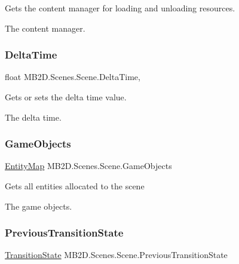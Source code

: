 Gets the content manager for loading and unloading resources. 

The content manager.\hypertarget{class_m_b2_d_1_1_scenes_1_1_scene_a43b51703cf436d8033fac12386b300ba}{}\label{class_m_b2_d_1_1_scenes_1_1_scene_a43b51703cf436d8033fac12386b300ba} 
\subsubsection{\texorpdfstring{Delta\+Time}{DeltaTime}}
{\footnotesize\ttfamily float M\+B2\+D.\+Scenes.\+Scene.\+Delta\+Time\hspace{0.3cm}{\ttfamily [get]}, {\ttfamily [set]}}



Gets or sets the delta time value. 

The delta time.\hypertarget{class_m_b2_d_1_1_scenes_1_1_scene_aae9f1aa11591fa124e5da41f53138ea1}{}\label{class_m_b2_d_1_1_scenes_1_1_scene_aae9f1aa11591fa124e5da41f53138ea1} 
\subsubsection{\texorpdfstring{Game\+Objects}{GameObjects}}
{\footnotesize\ttfamily \hyperlink{class_m_b2_d_1_1_entity_component_1_1_entity_map}{Entity\+Map} M\+B2\+D.\+Scenes.\+Scene.\+Game\+Objects\hspace{0.3cm}{\ttfamily [get]}}



Gets all entities allocated to the scene 

The game objects.\hypertarget{class_m_b2_d_1_1_scenes_1_1_scene_ac683a1684a15a3da44197188e13d2c2a}{}\label{class_m_b2_d_1_1_scenes_1_1_scene_ac683a1684a15a3da44197188e13d2c2a} 
\subsubsection{\texorpdfstring{Previous\+Transition\+State}{PreviousTransitionState}}
{\footnotesize\ttfamily \hyperlink{namespace_m_b2_d_1_1_scenes_a0e0db3f97bbaa272f70534c5954c4acc}{Transition\+State} M\+B2\+D.\+Scenes.\+Scene.\+Previous\+Transition\+State\hspace{0.3cm}{\ttfamily [get]}}



